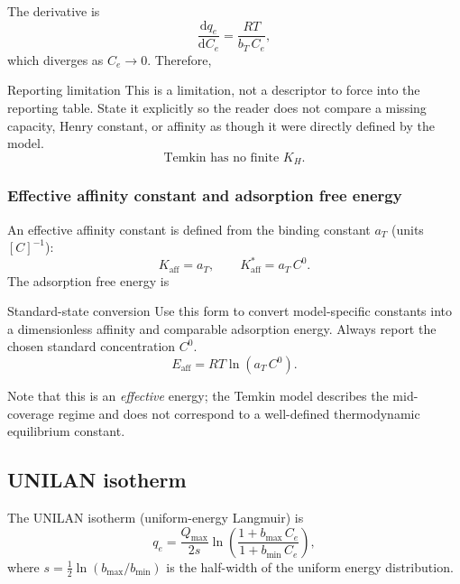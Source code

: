 \documentclass[journal=jacsat,manuscript=article]{achemso}
\begin{document}
The derivative is
\begin{equation}
	\frac{\mathrm{d}q_e}{\mathrm{d}C_e} = \frac{RT}{b_T\, C_e},
\end{equation}
which diverges as $C_e \to 0$. Therefore,
\begin{redbox}{Reporting limitation}
	This is a limitation, not a descriptor to force into the reporting table. State it explicitly so the reader does not compare a missing capacity, Henry constant, or affinity as though it were directly defined by the model.
\begin{equation}
	\text{Temkin has no finite } K_H.
\end{equation}
\end{redbox}

\subsubsection{Effective affinity constant and adsorption free energy}

An effective affinity constant is defined from the binding constant $a_T$ (units $[C]^{-1}$):
\begin{equation}
	K_{\mathrm{aff}} = a_T,
	\qquad
	K_{\mathrm{aff}}^{\ast} = a_T\, C^0.
\end{equation}
The adsorption free energy is
\begin{greenbox}{Standard-state conversion}
	Use this form to convert model-specific constants into a dimensionless affinity and comparable adsorption energy. Always report the chosen standard concentration \(C^0\).
\begin{equation}
	E_{\mathrm{aff}} = RT\ln(a_T\, C^0).
\end{equation}
\end{greenbox}
Note that this is an \emph{effective} energy; the Temkin model describes the mid-coverage regime and does not correspond to a well-defined thermodynamic equilibrium constant.

\subsection{UNILAN isotherm}
\label{sec:si_unilan}

The UNILAN isotherm (uniform-energy Langmuir) is
\begin{equation}
	q_e = \frac{Q_{\max}}{2s}
	\ln\!\left(
	\frac{1 + b_{\max}\, C_e}{1 + b_{\min}\, C_e}
	\right),
	\label{eq:si_unilan}
\end{equation}
where $s = \tfrac{1}{2}\ln(b_{\max}/b_{\min})$ is the half-width of the uniform energy distribution.
\end{document}
